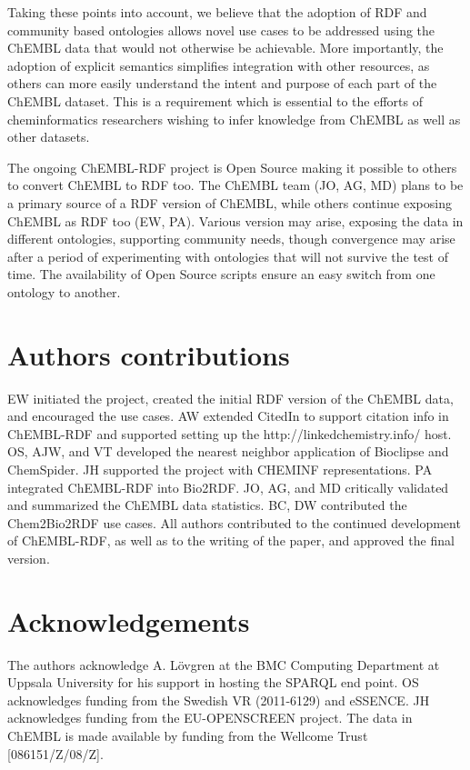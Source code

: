 \documentclass[10pt]{bmc_article}
\newenvironment{bmcformat}{\begin{raggedright}\baselineskip20pt\sloppy\setboolean{publ}{false}}{\end{raggedright}\baselineskip20pt\sloppy}
\begin{document}
\begin{bmcformat}
Taking these points into account, we believe that the adoption of RDF and community based ontologies allows
novel use cases to be addressed using the ChEMBL data that would not otherwise be achievable. More importantly, the adoption of explicit
semantics simplifies integration with other resources, as others can more easily understand the intent and purpose of each part of the ChEMBL dataset.
This is a requirement which is essential to the efforts of cheminformatics researchers wishing to infer knowledge
from ChEMBL as well as other datasets.

The ongoing ChEMBL-RDF project is Open Source making it possible to others to convert ChEMBL to RDF too.
The ChEMBL team (JO, AG, MD) plans to be a primary source of a RDF version of ChEMBL, while others continue
exposing ChEMBL as RDF too (EW, PA). Various version may arise, exposing the data in different ontologies,
supporting community needs, though convergence may arise after a period of experimenting with ontologies that
will not survive the test of time. The availability of Open Source scripts ensure an easy switch from one
ontology to another.

\section*{Authors contributions}
EW initiated the project, created the initial RDF version of the ChEMBL data, and encouraged the use cases.
AW extended CitedIn to support citation info in ChEMBL-RDF and supported setting up the http://linkedchemistry.info/ host.
OS, AJW, and VT developed the nearest neighbor application of Bioclipse and ChemSpider.
JH supported the project with CHEMINF representations. PA integrated ChEMBL-RDF into Bio2RDF.
JO, AG, and MD critically validated and summarized the ChEMBL data statistics.
BC, DW contributed the Chem2Bio2RDF use cases.
All authors contributed to the continued development of ChEMBL-RDF, as well as to the writing of the paper,
and approved the final version.

\section*{Acknowledgements}

The authors acknowledge A. L\"ovgren at the BMC Computing Department at Uppsala University for his
support in hosting the SPARQL end point. OS acknowledges funding from the Swedish VR (2011-6129) and eSSENCE. 
JH acknowledges funding from the EU-OPENSCREEN project. 
The data in ChEMBL is made available by funding from the Wellcome Trust [086151/Z/08/Z].


\end{bmcformat}
\end{document}
